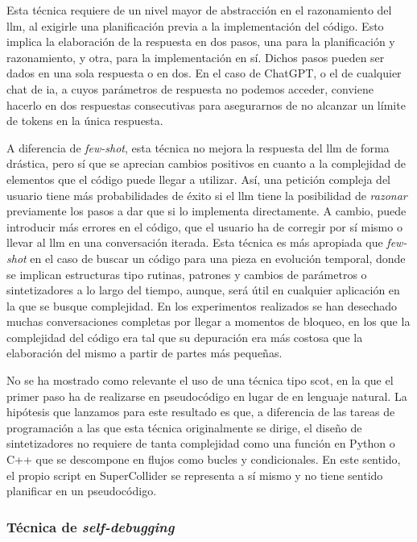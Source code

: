 Esta técnica requiere de un nivel mayor de abstracción en el razonamiento del \gls{llm}, al exigirle una planificación previa a la implementación del código. Esto implica la elaboración de la respuesta en dos pasos, una para la planificación y razonamiento, y otra, para la implementación en sí. Dichos pasos pueden ser dados en una sola respuesta o en dos. En el caso de ChatGPT, o el de cualquier chat de \gls{ia}, a cuyos parámetros de respuesta no podemos acceder, conviene hacerlo en dos respuestas consecutivas para asegurarnos de no alcanzar un límite de tokens en la única respuesta. 

A diferencia de \emph{few-shot}, esta técnica no mejora la respuesta del \gls{llm} de forma drástica, pero sí que se aprecian cambios positivos en cuanto a la complejidad de elementos que el código puede llegar a utilizar. Así, una petición compleja del usuario tiene más probabilidades de éxito si el \gls{llm} tiene la posibilidad de \emph{razonar} previamente los pasos a dar que si lo implementa directamente. A cambio, puede introducir más errores en el código, que el usuario ha de corregir por sí mismo o llevar al \gls{llm} en una conversación iterada. Esta técnica es más apropiada que \emph{few-shot} en el caso de buscar un código para una pieza en evolución temporal, donde se implican estructuras tipo rutinas, patrones y cambios de parámetros o sintetizadores a lo largo del tiempo, aunque, será útil en cualquier aplicación en la que se busque complejidad. En los experimentos realizados se han desechado muchas conversaciones completas por llegar a momentos de bloqueo, en los que la complejidad del código era tal que su depuración era más costosa que la elaboración del mismo a partir de partes más pequeñas.

No se ha mostrado como relevante el uso de una técnica tipo \gls{scot}, en la que el primer paso ha de realizarse en pseudocódigo en lugar de en lenguaje natural. La hipótesis que lanzamos para este resultado es que, a diferencia de las tareas de programación a las que esta técnica originalmente se dirige, el diseño de sintetizadores no requiere de tanta complejidad como una función en Python o C++ que se descompone en flujos como bucles y condicionales. En este sentido, el propio script en SuperCollider se representa a sí mismo y no tiene sentido planificar en un pseudocódigo.

\subsubsection{Técnica de \emph{self-debugging}}

